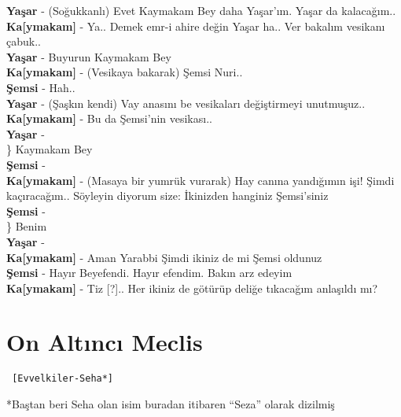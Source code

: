 \documentclass[]{book}
\begin{document}
\textbf{Yaşar} - (Soğukkanlı) Evet Kaymakam Bey daha Yaşar'ım. Yaşar da kalacağım..\\
\textbf{Ka{[}ymakam{]}} - Ya.. Demek emr-i ahire değin Yaşar ha.. Ver bakalım vesikanı çabuk..\\
\textbf{Yaşar} - Buyurun Kaymakam Bey\\
\textbf{Ka{[}ymakam{]}} - (Vesikaya bakarak) Şemsi Nuri..\\
\textbf{Şemsi} - Hah..\\
\textbf{Yaşar} - (Şaşkın kendi) Vay anasını be vesikaları değiştirmeyi unutmuşuz..\\
\textbf{Ka{[}ymakam{]}} - Bu da Şemsi'nin vesikası..\\

\textbf{Yaşar} -\\
\} Kaymakam Bey\\
\textbf{Şemsi} -\\
\textbf{Ka{[}ymakam{]}} - (Masaya bir yumrük vurarak) Hay canına yandığımın işi! Şimdi kaçıracağım.. Söyleyin diyorum size: İkinizden hanginiz Şemsi'siniz\\
\textbf{Şemsi} -\\
\} Benim\\
\textbf{Yaşar} -\\
\textbf{Ka{[}ymakam{]}} - Aman Yarabbi Şimdi ikiniz de mi Şemsi oldunuz\\
\textbf{Şemsi} - Hayır Beyefendi. Hayır efendim. Bakın arz edeyim\\
\textbf{Ka{[}ymakam{]}} - Tiz {[}?{]}.. Her ikiniz de götürüp deliğe tıkacağım anlaşıldı mı?\\

\hypertarget{on-altinci-meclis-1}{%
\section{On Altıncı Meclis}\label{on-altinci-meclis-1}}

\begin{verbatim}
 [Evvelkiler-Seha*]
\end{verbatim}

*Baştan beri Seha olan isim buradan itibaren ``Seza'' olarak dizilmiş\\
\end{document}
